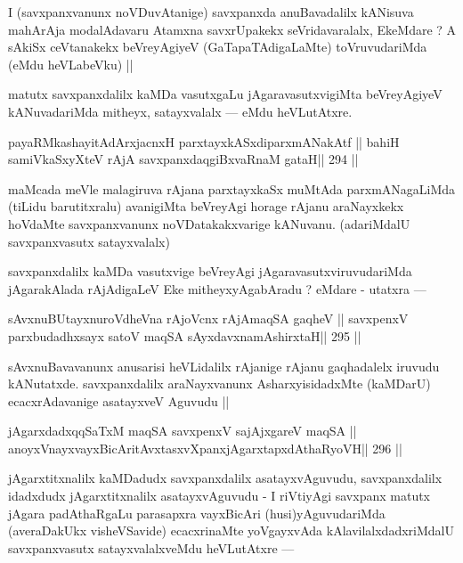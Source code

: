 \begin{artha}
I (savxpanxvanunx noVDuvAtanige) savxpanxda anuBavadalilx kANisuva mahArAja modalAdavaru Atamxna savxrUpakekx seVridavaralalx, EkeMdare ? A sAkiSx ceVtanakekx beVreyAgiyeV (GaTapaTAdigaLaMte) toVruvudariMda (eMdu heVLabeVku) ||
\end{artha}

\begin{artha}
matutx savxpanxdalilx kaMDa vasutxgaLu jAgaravasutxvigiMta beVreyAgiyeV kANuvadariMda mitheyx, satayxvalalx --- eMdu heVLutAtxre.
\end{artha}

\begin{shl}
payaRMkashayitAdArxjacnxH parxtayxkASxdiparxmANakAtf ||
bahiH samiVkaSxyXteV rAjA savxpanxdaqgiBxvaRnaM gataH\hfill || 294 ||
\end{shl}

\begin{artha}
maMcada meVle malagiruva rAjana parxtayxkaSx muMtAda parxmANagaLiMda (tiLidu barutitxralu) avanigiMta beVreyAgi horage rAjanu araNayxkekx hoVdaMte savxpanxvanunx noVDatakakxvarige kANuvanu. (adariMdalU savxpanxvasutx satayxvalalx)
\end{artha}

\begin{artha}
savxpanxdalilx kaMDa vasutxvige beVreyAgi jAgaravasutxviruvudariMda jAgarakAlada rAjAdigaLeV Eke mitheyxyAgabAradu ? eMdare - utatxra ---
\end{artha}

\begin{shl}
sAvxnuBUtayxnuroVdheVna rAjoVcnx rAjA\s maqSA gaqheV ||
savxpenxV parxbudadhxsayx satoV maqSA sAyxdavxnamAshirxtaH\hfill || 295 ||
\end{shl}

\begin{artha}
sAvxnuBavavanunx anusarisi heVLidalilx rAjanige rAjanu gaqhadalelx iruvudu kANutatxde. savxpanxdalilx araNayxvanunx AsharxyisidadxMte (kaMDarU) ecacxrAdavanige asatayxveV Aguvudu ||
\end{artha}

\begin{shl}
jAgarxdadxqqSaTxM maqSA savxpenxV sajAjxgareV maqSA ||
anoyxVnayxvayxBicAritAvxtasxvXpanxjAgarxtapxdAthaRyoVH\hfill || 296 ||
\end{shl}

\begin{artha}
jAgarxtitxnalilx kaMDadudx savxpanxdalilx asatayxvAguvudu, 
savxpanxdalilx idadxdudx jAgarxtitxnalilx asatayxvAguvudu - I riVtiyAgi savxpanx matutx jAgara padAthaRgaLu parasapxra vayxBicAri (husi)yAguvudariMda (averaDakUkx visheVSavide) ecacxrinaMte yoVgayxvAda kAlavilalxdadxriMdalU savxpanxvasutx satayxvalalxveMdu heVLutAtxre ---
\end{artha}

